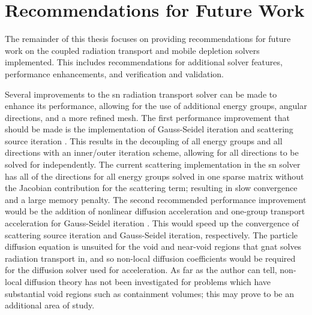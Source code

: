 \chapter{Recommendations for Future Work} 
\label{recommendations}

The remainder of this thesis focuses on providing recommendations for future work on the coupled radiation transport and mobile depletion solvers implemented. This includes recommendations for additional solver features, performance enhancements, and verification and validation. 

Several improvements to the \acrshort{sn} radiation transport solver can be made to enhance its performance, allowing for the use of additional energy groups, angular directions, and a more refined mesh. The first performance improvement that should be made is the implementation of Gauss-Seidel iteration and scattering source iteration \cite{denovo,computational_methods}. This results in the decoupling of all energy groups and all directions with an inner/outer iteration scheme, allowing for all directions to be solved for independently. The current scattering implementation in the \acrshort{sn} solver has all of the directions for all energy groups solved in one sparse matrix without the Jacobian contribution for the scattering term; resulting in slow convergence and a large memory penalty. The second recommended performance improvement would be the addition of nonlinear diffusion acceleration \cite{cgfem_saaf_sn_2} and one-group transport acceleration for Gauss-Seidel iteration \cite{denovo}. This would speed up the convergence of scattering source iteration and Gauss-Seidel iteration, respectively. The particle diffusion equation is unsuited for the void and near-void regions that \acrshort{gnat} solves radiation transport in, and so non-local diffusion coefficients \cite{non_local_morel_larsen} would be required for the diffusion solver used for acceleration. As far as the author can tell, non-local diffusion theory has not been investigated for problems which have substantial void regions such as containment volumes; this may prove to be an additional area of study. 

